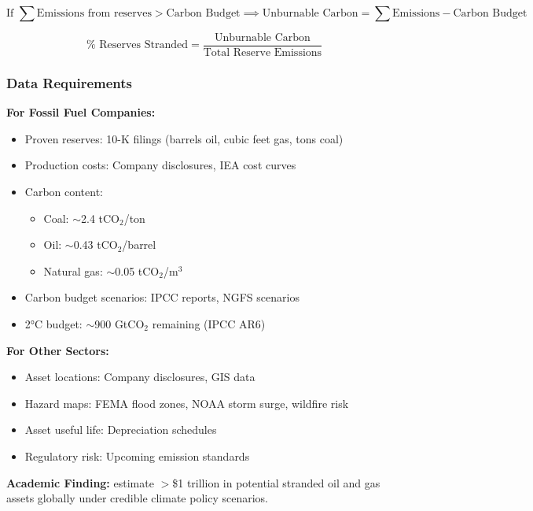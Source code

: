 \documentclass[11pt,a4paper]{article}
\begin{document}
\begin{equation}
\text{If } \sum \text{Emissions from reserves} > \text{Carbon Budget} \implies \text{Unburnable Carbon} = \sum \text{Emissions} - \text{Carbon Budget}
\end{equation}

\begin{equation}
\% \text{ Reserves Stranded} = \frac{\text{Unburnable Carbon}}{\text{Total Reserve Emissions}}
\end{equation}

\subsubsection{Data Requirements}

\textbf{For Fossil Fuel Companies:}
\begin{itemize}
    \item Proven reserves: 10-K filings (barrels oil, cubic feet gas, tons coal)
    \item Production costs: Company disclosures, IEA cost curves
    \item Carbon content:
    \begin{itemize}
        \item Coal: $\sim$2.4 tCO$_2$/ton
        \item Oil: $\sim$0.43 tCO$_2$/barrel
        \item Natural gas: $\sim$0.05 tCO$_2$/m$^3$
    \end{itemize}
    \item Carbon budget scenarios: IPCC reports, NGFS scenarios
    \item 2°C budget: $\sim$900 GtCO$_2$ remaining (IPCC AR6)
\end{itemize}

\textbf{For Other Sectors:}
\begin{itemize}
    \item Asset locations: Company disclosures, GIS data
    \item Hazard maps: FEMA flood zones, NOAA storm surge, wildfire risk
    \item Asset useful life: Depreciation schedules
    \item Regulatory risk: Upcoming emission standards
\end{itemize}

\textbf{Academic Finding:} \citet{Semieniuk2022} estimate $>$\$1 trillion in potential stranded oil and gas assets globally under credible climate policy scenarios.
\end{document}

